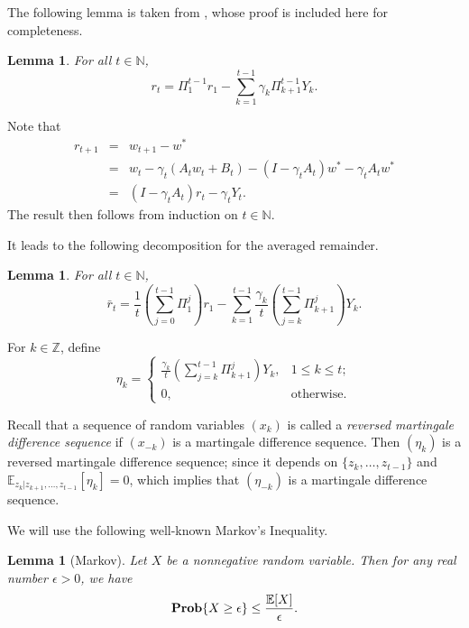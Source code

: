 \documentclass[twoside,twocolumn,journal]{IEEEtran}
\newtheorem{lem}[thm]{Lemma}
\newenvironment{pf}[1][Proof]{\medskip\noindent\hspace{1em}{\itshape #1: }}{\hspace*{\fill}~\QED\par\endtrivlist\medskip}
\newcommand{\DS}{\displaystyle}
\def\N{{\mathbb N}}
\def\Z{{\mathbb Z}}        %
\def\E{{\mathbb E}}        %
\def\Prob{{\bf Prob}}
\begin{document}
The following lemma is taken from \cite{SmaYao04}, whose proof is included here for completeness.

\medskip

\begin{lem}\label{lem:oldrt} For all $t\in \N$,
\[ r_{t} = \Pi_1^{t-1} r_1 - \sum_{k=1}^{t-1}\gamma_k  \Pi_{k+1}^{t-1} Y_k. \]
\end{lem}

\begin{pf} Note that
\begin{eqnarray*}
r_{t+1}& = & w_{t+1}- w^\ast \\
& = & w_t - \gamma_t (A_t w_t + B_t) - (I-\gamma_t A_t) w^\ast - \gamma_t A_t w^\ast \\
& = & (I-\gamma_t A_t) r_t - \gamma_t Y_t.
\end{eqnarray*}
The result then follows from induction on $t\in \N$.
\end{pf}

It leads to the following decomposition for
the averaged remainder.

\medskip

\begin{lem} For all $t\in \N$,
\[ \bar{r}_{t} = \frac{1}{t} \left(\sum_{j=0}^{t-1} \Pi_1^j \right) r_1 - \sum_{k=1}^{t-1}\frac{\gamma_k}{t}  \left(\sum_{j=k}^{t-1}\Pi_{k+1}^{j}\right) Y_k. \]
\end{lem}

\medskip

For $k\in \Z$, define
\[ \eta_k =
\left\{
\begin{array}{ll}
\DS \frac{\gamma_k}{t} \left(\sum_{j=k}^{t-1} \Pi_{k+1}^j\right)Y_k, & 1\leq k \leq t; \\
0, & \mbox{otherwise}.
\end{array}
\right.
\]

Recall that a sequence of random variables $(x_k)$ is called a \emph{reversed martingale difference sequence}
if $(x_{-k})$ is a martingale difference sequence. Then $(\eta_k)$
is a reversed martingale difference sequence; since it depends on $\{z_k,\ldots,z_{t-1}\}$ and $\E_{z_k|z_{k+1},\ldots,z_{t-1}}[\eta_k]=0$,
which implies that $(\eta_{-k})$ is a martingale difference sequence.

We will use the following well-known Markov's Inequality.

\medskip

\begin{lem}[Markov] Let $X$ be a nonnegative random variable.
Then for any real number $\epsilon>0$, we have
\[ \Prob\{ X\geq \epsilon \} \leq \frac{\E[X]}{\epsilon}. \]
\end{lem}
\end{document}
